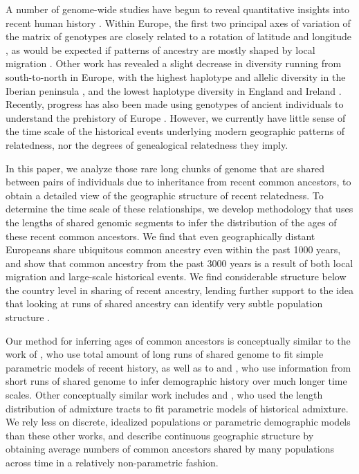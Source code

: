 \documentclass{article}
\begin{document}
A number of genome-wide studies have begun to reveal quantitative insights into recent human history \citep{novembre2011perspectives}. 
Within Europe,
the first two principal axes of variation of the matrix of genotypes
are closely related to a rotation of latitude and longitude
\citep{menozzi1978synthetic,novembre2008europe,lao2008correlation}, 
as would be expected if patterns of ancestry are mostly shaped by local migration \citep{novembre2008interpreting}.
Other work has revealed a slight decrease in diversity running from south-to-north in Europe, 
with the highest haplotype and allelic diversity in the Iberian peninsula
\citep[e.g.][]{lao2008correlation,auton2009global,nelson2012abundance}, 
and the lowest haplotype diversity in England and Ireland \citep{odushlaine2010population}.
Recently, progress has also been made using genotypes of ancient individuals to understand the prehistory of Europe 
\citep{patterson2012ancient,skoglund2012origins,keller2012insights}.
However, we currently have little sense of the 
time scale of the historical events underlying modern geographic patterns of relatedness,
nor the degrees of genealogical relatedness they imply.

In this paper, we analyze those rare long chunks of genome
that are shared between pairs of individuals due to inheritance from recent common ancestors,
to obtain a detailed view of the geographic structure of recent relatedness.
To determine the time scale of these relationships,
we develop methodology that uses the lengths of shared genomic segments 
to infer the distribution of the ages of these recent common ancestors.
We find that even geographically distant Europeans share
ubiquitous common ancestry even within the past 1000 years,
and show that common ancestry from the past 3000 years 
is a result of both local migration and large-scale historical events.
We find considerable structure below the country level in sharing of recent ancestry,
lending further support to the idea that looking at runs of shared ancestry can identify very subtle population structure \citep[e.g.][]{lawson2012inference}.

Our method for inferring ages of common ancestors is conceptually similar to the work of \citet{palamara2012length},
who use total amount of long runs of shared genome to fit simple parametric models of recent history,
as well as to \citet{li2011inference} and \citet{harris2012inferring},
who use information from short runs of shared genome
to infer demographic history over much longer time scales.
Other conceptually similar work includes \citet{pool2009inference} and \citet{gravel2012population},
who used the length distribution of admixture tracts to fit parametric models of historical admixture.
We rely less on discrete, idealized populations or parametric demographic models than these other works,
and describe continuous geographic structure by obtaining average numbers of common ancestors shared 
by many populations across time in a relatively non-parametric fashion.
\end{document}
